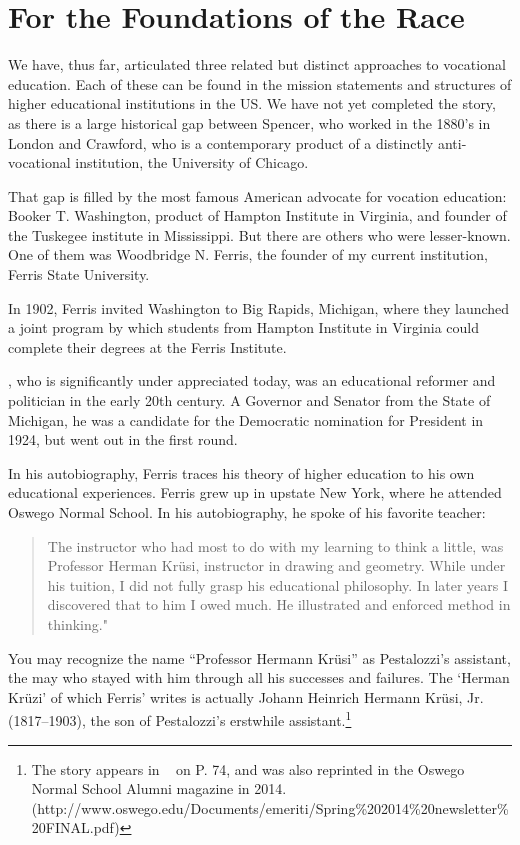 \section{For the Foundations of the Race}
\label{forthefoundationsoftherace}

We have, thus far, articulated three related but distinct approaches to vocational education. Each of these can be found in the mission statements and structures of higher educational institutions in the US. We have not yet completed the story, as there is a large historical gap between Spencer, who worked in the 1880's in London and Crawford, who is a contemporary product of a distinctly anti-vocational institution, the University of Chicago. 

That gap is filled by the most famous American advocate for vocation education: Booker T. Washington, product of Hampton Institute in Virginia, and founder of the Tuskegee institute in Mississippi. But there are others who were lesser-known. One of them was Woodbridge N. Ferris, the founder of my current institution, Ferris State University.

In 1902, Ferris invited Washington to Big Rapids, Michigan, where they launched a joint program by which students from Hampton Institute in Virginia could complete their degrees at the Ferris Institute. 

, who is significantly under appreciated today, was an educational reformer and politician in the early 20th century. A Governor and Senator from the State of Michigan, he was a candidate for the Democratic nomination for President in 1924, but went out in the first round. 

In his autobiography, Ferris traces his theory of higher education to his own educational experiences. Ferris grew up in upstate New York, where he attended Oswego Normal School. In his autobiography, he spoke of his favorite teacher:

\begin{quote}

The instructor who had most to do with my learning to think a little, was Professor Herman Krüsi, instructor in drawing and geometry. While under his tuition, I did not fully grasp his educational philosophy. In later years I discovered that to him I owed much. He illustrated and enforced method in thinking." ~\citep[p. 99]{Ferris:1995tt}
\end{quote}

You may recognize the name ``Professor Hermann Krüsi'' as Pestalozzi's assistant, the may who stayed with him through all his successes and failures. The `Herman Krüzi' of which Ferris' writes is actually Johann Heinrich Hermann Krüsi, Jr. (1817--1903), the son of Pestalozzi's erstwhile assistant.\footnote{The story appears in ~\citep[p. 74]{Deupree:1982wn} on P. 74, and was also reprinted in the Oswego Normal School Alumni magazine in 2014. (http:\slash \slash www.oswego.edu\slash Documents\slash emeriti\slash Spring\%202014\%20newsletter\%20FINAL.pdf)} 

